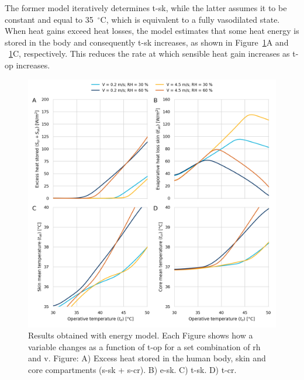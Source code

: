 The former model iteratively determines \ac{t-sk}, while the latter assumes it to be constant and equal to 35~$^{\circ}$C\@, which is equivalent to a fully vasodilated state.
When heat gains exceed heat losses, the  model estimates that some heat energy is stored in the body and consequently \ac{t-sk} increases, as shown in Figure~\ref{fig:results_model_2}A and ~\ref{fig:results_model_2}C, respectively.
This reduces the rate at which sensible heat gain increases as \ac{t-op} increases.

\begin{figure}[hbt!]
    \centering
    \includegraphics[width=\textwidth]{figures/results_model_2}
    \caption{Results obtained with  energy model.
    Each Figure shows how a variable changes as a function of \ac{t-op} for a set combination of \ac{rh} and \ac{v}.
    Figure: A)  Excess heat stored in the human body, skin and core compartments (\ac{s-sk} + \ac{s-cr}).
    B) \Acf{e-sk}.
    C) \Acf{t-sk}.
    D) \Acf{t-cr}.}
    \label{fig:results_model_2}
\end{figure}

